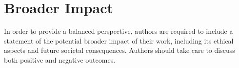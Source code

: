 \documentclass{article}
\begin{document}
\section{Broader Impact}
In order to provide a balanced perspective, authors are required to include a statement of the potential broader impact of their work, including its ethical aspects and future societal consequences. Authors should take care to discuss both positive and negative outcomes.

\small

\end{document}
